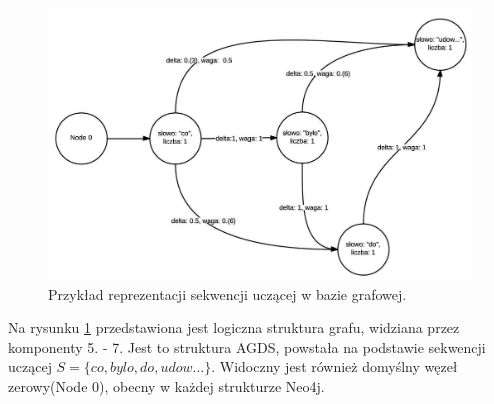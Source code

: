 \begin{figure}[h!]
    \label{graph:logic_graph}
    \includegraphics[width=\textwidth]{logic_graph}
    \caption{Przykład reprezentacji sekwencji uczącej w bazie grafowej.}
\end{figure}

Na rysunku \ref{graph:logic_graph} przedstawiona jest logiczna struktura grafu, widziana przez komponenty 5. - 7. Jest to struktura AGDS, powstała na podstawie sekwencji uczącej
$S = \{co, byl{}o, do, udow...\}$. Widoczny jest również domyślny węzeł zerowy(Node 0), obecny w każdej strukturze Neo4j.

